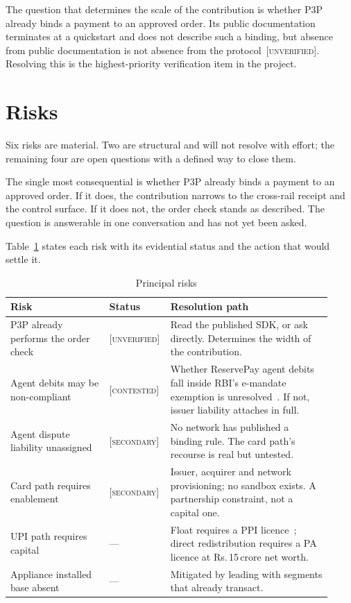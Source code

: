 \documentclass[journal,onecolumn,11pt]{IEEEtran}
\newcommand{\rs}{Rs.\,}
\newcommand{\secondary}{{\footnotesize\textsc{\textcolor{gray!80!black}{[secondary]}}}}
\newcommand{\unver}{{\footnotesize\textsc{\textcolor{orange!80!black}{[unverified]}}}}
\newcommand{\contested}{{\footnotesize\textsc{\textcolor{red!70!black}{[contested]}}}}
\begin{document}
The question that determines the scale of the contribution is whether P3P already
binds a payment to an approved order. Its public documentation terminates at a
quickstart and does not describe such a binding, but absence from public documentation
is not absence from the protocol~\unver. Resolving this is the highest-priority
verification item in the project.

\section{Risks}\label{sec:risk}
Six risks are material. Two are structural and will not resolve with effort; the
remaining four are open questions with a defined way to close them.

The single most consequential is whether P3P already binds a payment to an approved
order. If it does, the contribution narrows to the cross-rail receipt and the control
surface. If it does not, the order check stands as described. The question is
answerable in one conversation and has not yet been asked.

Table~\ref{tab:risk} states each risk with its evidential status and the action that
would settle it.

\begin{table}[t]
\centering
\caption{Principal risks}
\label{tab:risk}
\begin{tabular}{@{}p{0.30\linewidth}p{0.13\linewidth}p{0.49\linewidth}@{}}
\toprule
\textbf{Risk} & \textbf{Status} & \textbf{Resolution path} \\
\midrule
P3P already performs the order check & \unver & Read the published SDK, or ask directly. Determines the width of the contribution. \\
Agent debits may be non-compliant & \contested & Whether ReservePay agent debits fall inside RBI's e-mandate exemption is unresolved~\cite{rbi-auth}. If not, issuer liability attaches in full. \\
Agent dispute liability unassigned & \secondary & No network has published a binding rule. The card path's recourse is real but untested. \\
Card path requires enablement & \secondary & Issuer, acquirer and network provisioning; no sandbox exists. A partnership constraint, not a capital one. \\
UPI path requires capital & --- & Float requires a PPI licence~\cite{rbi-ppi}; direct redistribution requires a PA licence at \rs 15\,crore net worth. \\
Appliance installed base absent & --- & Mitigated by leading with segments that already transact. \\
\bottomrule
\end{tabular}
\end{table}
\end{document}
